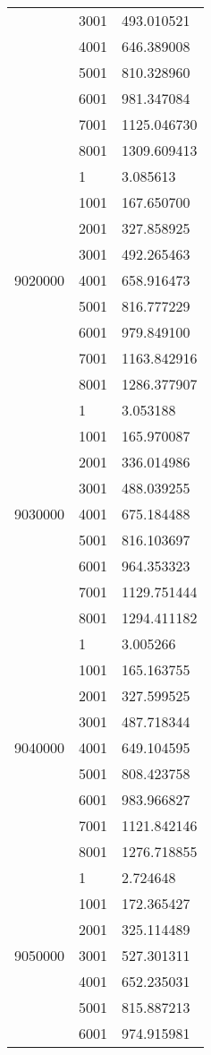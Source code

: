 \begin{table}[htb!]
\begin{tabular}{lll}
 & 3001 & 493.010521 \\
 & 4001 & 646.389008 \\
 & 5001 & 810.328960 \\
 & 6001 & 981.347084 \\
 & 7001 & 1125.046730 \\
 & 8001 & 1309.609413 \\
\multirow[c]{9}{*}{9020000} & 1 & 3.085613 \\
 & 1001 & 167.650700 \\
 & 2001 & 327.858925 \\
 & 3001 & 492.265463 \\
 & 4001 & 658.916473 \\
 & 5001 & 816.777229 \\
 & 6001 & 979.849100 \\
 & 7001 & 1163.842916 \\
 & 8001 & 1286.377907 \\
\multirow[c]{9}{*}{9030000} & 1 & 3.053188 \\
 & 1001 & 165.970087 \\
 & 2001 & 336.014986 \\
 & 3001 & 488.039255 \\
 & 4001 & 675.184488 \\
 & 5001 & 816.103697 \\
 & 6001 & 964.353323 \\
 & 7001 & 1129.751444 \\
 & 8001 & 1294.411182 \\
\multirow[c]{9}{*}{9040000} & 1 & 3.005266 \\
 & 1001 & 165.163755 \\
 & 2001 & 327.599525 \\
 & 3001 & 487.718344 \\
 & 4001 & 649.104595 \\
 & 5001 & 808.423758 \\
 & 6001 & 983.966827 \\
 & 7001 & 1121.842146 \\
 & 8001 & 1276.718855 \\
\multirow[c]{9}{*}{9050000} & 1 & 2.724648 \\
 & 1001 & 172.365427 \\
 & 2001 & 325.114489 \\
 & 3001 & 527.301311 \\
 & 4001 & 652.235031 \\
 & 5001 & 815.887213 \\
 & 6001 & 974.915981 \\

\end{tabular}
\end{table}
